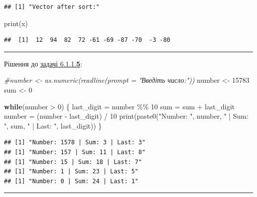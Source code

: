 \documentclass[
]{book}
\newenvironment{Shaded}{\begin{snugshade}}{\end{snugshade}}
\newcommand{\CommentTok}[1]{\textcolor[rgb]{0.56,0.35,0.01}{\textit{#1}}}
\newcommand{\ControlFlowTok}[1]{\textcolor[rgb]{0.13,0.29,0.53}{\textbf{#1}}}
\newcommand{\DecValTok}[1]{\textcolor[rgb]{0.00,0.00,0.81}{#1}}
\newcommand{\FunctionTok}[1]{\textcolor[rgb]{0.00,0.00,0.00}{#1}}
\newcommand{\NormalTok}[1]{#1}
\newcommand{\OtherTok}[1]{\textcolor[rgb]{0.56,0.35,0.01}{#1}}
\newcommand{\SpecialCharTok}[1]{\textcolor[rgb]{0.00,0.00,0.00}{#1}}
\newcommand{\StringTok}[1]{\textcolor[rgb]{0.31,0.60,0.02}{#1}}
\begin{document}
\begin{verbatim}
## [1] "Vector after sort:"
\end{verbatim}

\begin{Shaded}
\begin{Highlighting}[]
\FunctionTok{print}\NormalTok{(x)}
\end{Highlighting}
\end{Shaded}

\begin{verbatim}
##  [1]  12  94  82  72 -61 -69 -87 -70  -3 -80
\end{verbatim}

\begin{center}\rule{0.5\linewidth}{0.5pt}\end{center}

Рішення до \protect\hyperlink{task6115}{задачі 6.1.1.\textbf{5}}:

\begin{Shaded}
\begin{Highlighting}[]
\CommentTok{\#number \textless{}{-} as.numeric(readline(prompt = "Введіть число:"))}
\NormalTok{number }\OtherTok{\textless{}{-}} \DecValTok{15783}
\NormalTok{sum }\OtherTok{\textless{}{-}} \DecValTok{0}

\ControlFlowTok{while}\NormalTok{(number }\SpecialCharTok{\textgreater{}} \DecValTok{0}\NormalTok{) \{}
\NormalTok{  last\_digit }\OtherTok{=}\NormalTok{ number }\SpecialCharTok{\%\%} \DecValTok{10}
\NormalTok{  sum }\OtherTok{=}\NormalTok{ sum }\SpecialCharTok{+}\NormalTok{ last\_digit}
\NormalTok{  number }\OtherTok{=}\NormalTok{ (number }\SpecialCharTok{{-}}\NormalTok{ last\_digit) }\SpecialCharTok{/} \DecValTok{10}
  \FunctionTok{print}\NormalTok{(}\FunctionTok{paste0}\NormalTok{(}\StringTok{"Number: "}\NormalTok{, number, }\StringTok{" | Sum: "}\NormalTok{, sum, }\StringTok{" | Last: "}\NormalTok{, last\_digit))}
\NormalTok{\}}
\end{Highlighting}
\end{Shaded}

\begin{verbatim}
## [1] "Number: 1578 | Sum: 3 | Last: 3"
## [1] "Number: 157 | Sum: 11 | Last: 8"
## [1] "Number: 15 | Sum: 18 | Last: 7"
## [1] "Number: 1 | Sum: 23 | Last: 5"
## [1] "Number: 0 | Sum: 24 | Last: 1"
\end{verbatim}

\begin{center}\rule{0.5\linewidth}{0.5pt}\end{center}
\end{document}
